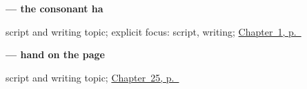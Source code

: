 \noindent\begin{minipage}[t]{\linewidth}
\raggedright
\textbf{ — the consonant ha}\par
\footnotesize script and writing topic; explicit focus: script, writing; \hyperref[ch:first-greeting-script]{Chapter~1, p.~\pageref*{ch:first-greeting-script}}
\end{minipage}\par\smallskip

\noindent\begin{minipage}[t]{\linewidth}
\raggedright
\textbf{ — hand on the page}\par
\footnotesize script and writing topic; \hyperref[ch:gu-hand-money-map]{Chapter~25, p.~\pageref*{ch:gu-hand-money-map}}
\end{minipage}\par\smallskip
